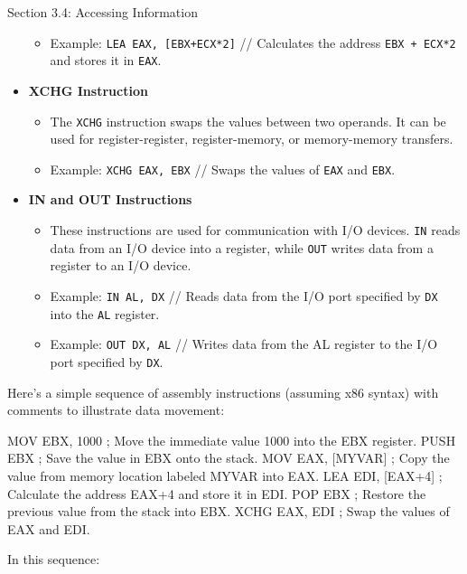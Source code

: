 \begin{notes}{Section 3.4: Accessing Information}
\begin{itemize}
\begin{itemize}
            \item Example: \texttt{LEA EAX, [EBX+ECX*2]} // Calculates the address \texttt{EBX + ECX*2} and stores it in \texttt{EAX}.
        \end{itemize}
        \item \textbf{XCHG Instruction}
        \begin{itemize}
            \item The \texttt{XCHG} instruction swaps the values between two operands. It can be used for register-register, register-memory, or memory-memory transfers.
            \item Example: \texttt{XCHG EAX, EBX} // Swaps the values of \texttt{EAX} and \texttt{EBX}.
        \end{itemize}
        \item \textbf{IN and OUT Instructions}
        \begin{itemize}
            \item These instructions are used for communication with I/O devices. \texttt{IN} reads data from an I/O device into a register, while \texttt{OUT} writes data from a register to an I/O 
            device.
            \item Example: \texttt{IN AL, DX} // Reads data from the I/O port specified by \texttt{DX} into the \texttt{AL} register.
            \item Example: \texttt{OUT DX, AL} // Writes data from the AL register to the I/O port specified by \texttt{DX}.
        \end{itemize}
    \end{itemize}

    \begin{highlight}
        Here's a simple sequence of assembly instructions (assuming x86 syntax) with comments to illustrate data movement:

    \begin{code}[Assembly]
    MOV EBX, 1000      ; Move the immediate value 1000 into the EBX register.
    PUSH EBX           ; Save the value in EBX onto the stack.
    MOV EAX, [MYVAR]   ; Copy the value from memory location labeled MYVAR into EAX.
    LEA EDI, [EAX+4]   ; Calculate the address EAX+4 and store it in EDI.
    POP EBX            ; Restore the previous value from the stack into EBX.
    XCHG EAX, EDI      ; Swap the values of EAX and EDI.        
    \end{code}

        In this sequence:


\end{highlight}
\end{notes}
